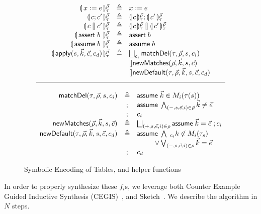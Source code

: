 \begin{figure}[ht]
  \[\begin{array}{r >{\triangleq}c l}
      \parenbb{x:=e}_\tau^{\vec\rho}
      && x:=e\\
      \parenbb{c;c'}_\tau^{\vec\rho}
      && \parenbb{c}_\tau^{\vec\rho};\parenbb{c'}_\tau^{\vec\rho} \\
      \parenbb{c \angel c'}_\tau^{\vec\rho}
      && \parenbb{c}_\tau^{\vec\rho} \angel \parenbb{c'}_\tau^{\vec\rho} \\
      \parenbb{\assert b}_\tau^{\vec\rho}
      && \assert b\\
      \parenbb{\assume b}_\tau^{\vec\rho}
      && \assume b\\
      \parenbb{\apply {s,\vec k, \vec c, c_d}}_\tau^{\vec\rho}
      && \Angel_{c_i}\mathsf{matchDel}(\tau, \vec\rho, s, c_i) \\
      \multicolumn 2 l {} & \angel \mathsf{newMatches}(\vec\rho, \vec k, s, \vec c) \\
      \multicolumn 2 l {} & \angel \mathsf{newDefault}(\tau, \vec\rho, \vec k,s, \vec c, c_d)\end{array}\]
  \[\begin{array}{r c l}
      \hline\\
      \mathsf{matchDel}(\tau,\vec\rho,s,c_i)
      &\triangleq
      &\mathsf{assume}\; \vec k \in M_i(\tau(s))\; \\
      &;&\mathsf{assume}\; \bigwedge_{(-,s,\vec e, i) \in \vec \rho} \vec k \neq \vec e\;\\
      &;&c_i \\
      \mathsf{newMatches}(\vec\rho, \vec k, s, \vec c)
      &\triangleq
      &\bigsqcup_{(+,s,\vec e, i) \in \rho} \mathsf{assume}\; \vec k = \vec e\;; c_i \\
      \mathsf{newDefault}(\tau, \vec\rho,\vec k, s, \vec c, c_d) &\triangleq& \mathsf{assume}\; \bigwedge\;_{c_i}k\not\in M_i(\tau_s) \\
      && \qquad\;\;\vee \bigvee_{(-,s,\vec e, i) \in \rho} \vec k = \vec e\\
      &;& c_d
    \end{array}\]
  \caption{Symbolic Encoding of Tables, and helper functions}
  \label{fig:symbolic-encoding}

\end{figure}

In order to properly synthesize these $f_i$s, we leverage both Counter Example
Guided Inductive Synthesis (CEGIS)~\cite{CEGIS}, and Sketch~\cite{Sketch}. We
describe the algorithm in $N$ steps.

